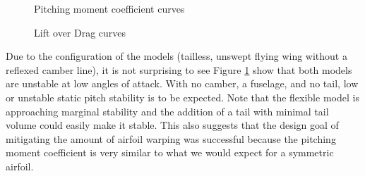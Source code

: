 \documentclass[11pt]{ucthesis}
\begin{document}
\begin{figure}[thpb]
\hfill
{}
\hfill
{}
\hfill
\caption{Pitching moment coefficient curves}
\label{fig:CM}
\end{figure}

\begin{figure}[thpb]
\hfill
{}
\hfill
{}
\hfill
\caption{Lift over Drag curves}
\label{fig:LD}
\end{figure}
Due to the configuration of the models (tailless, unswept flying wing without a reflexed camber line), it is not surprising to see Figure \ref{fig:CM} show that both models are unstable at low angles of attack. With no camber, a fuselage, and no tail, low or unstable static pitch stability is to be expected. Note that the flexible model is approaching marginal stability and the addition of a tail with minimal tail volume could easily make it stable. This also suggests that the design goal of mitigating the amount of airfoil warping was successful because the pitching moment coefficient is very similar to what we would expect for a symmetric airfoil.
\end{document}
